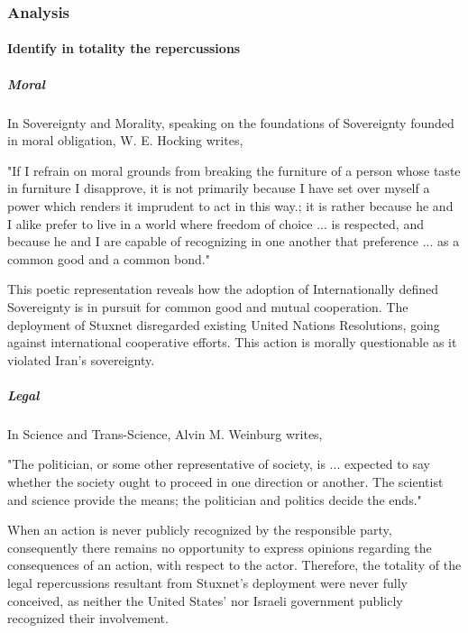 \documentclass[12pt]{article}
\begin{document}
\begin{multicols}{2}
\subsubsection{Analysis}

\paragraph{Identify in totality the repercussions}

\subparagraph{Moral}

In Sovereignty and Morality, speaking on the foundations of Sovereignty founded in moral obligation, W. E. Hocking writes,

\begin{displayquote}
"If I refrain on moral grounds from breaking the furniture of a person whose taste in furniture I disapprove, it is not primarily because I have set over myself a power which renders it imprudent to act in this way.; it is rather because he and I alike prefer to live in a world where freedom of choice ... is respected, and because he and I are capable of recognizing in one another that preference ... as a common good and a common bond."\cite{soverigntyAndMoralObligation}
\end{displayquote}

This poetic representation reveals how the adoption of Internationally defined Sovereignty is in pursuit for common good and mutual cooperation. The deployment of Stuxnet disregarded existing United Nations Resolutions, going against international cooperative efforts.\cite{resolution1747} This action is morally questionable as it violated Iran's sovereignty.

\subparagraph{Legal}

In Science and Trans-Science, Alvin M. Weinburg writes,

\begin{displayquote}
"The politician, or some other representative of society, is ... expected to say whether the society ought to proceed in one direction or another. The scientist and science provide the means; the politician and politics decide the ends."\cite{scienceAndTransScience}
\end{displayquote}

When an action is never publicly recognized by the responsible party, consequently there remains no opportunity to express opinions regarding the consequences of an action, with respect to the actor. Therefore, the totality of the legal repercussions resultant from Stuxnet's deployment were never fully conceived, as neither the United States' nor Israeli government publicly recognized their involvement.


\end{multicols}
\end{document}

